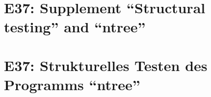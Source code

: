 
\thispagestyle{empty}
\ifenglish
\section*{E37: Supplement ``Structural testing'' and ``ntree''}

\fi
\ifgerman
\section*{E37: Strukturelles Testen des Programms "`ntree"'}

\fi


